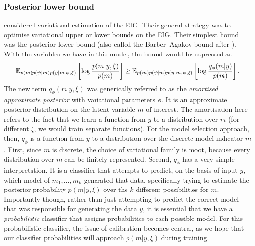 \documentclass[a4paper, 10pt]{report}
\theoremstyle{plain}
\begin{document}
	\subsubsection{Posterior lower bound}
	\citet{foster2019variational} considered variational estimation of the EIG. Their general strategy was to optimise variational upper or lower bounds on the EIG.
	Their simplest bound was the posterior lower bound  (also called the Barber--Agakov bound after \citet{ba}).
	With the variables we have in this model, the bound would be expressed as
	\begin{equation}
	\mathbb{E}_{p(m)p(\psi|m)p(y|m,\psi,\xi)}\left[ \log \frac{p(m|y,\xi)}{p(m)} \right] \ge \mathbb{E}_{p(m)p(\psi|m)p(y|m,\psi,\xi)}\left[ \log \frac{q_\phi(m|y)}{p(m)} \right].
	\end{equation}
	The new term $q_\phi(m|y,\xi)$ was generically referred to as the \emph{amortised approximate posterior} with variational parameters $\phi$. It is an approximate posterior distribution on the latent variable $m$ of interest. The amortisation here refers to the fact that we learn a function from $y$ to a distribution over $m$ (for different $\xi$, we would train separate functions).
	For the model selection approach, then, $q_\phi$ is a function from $y$ to a distribution over the discrete model indicator $m$.
	First, since $m$ is discrete, the choice of variational family is moot, because every distribution over $m$ can be finitely represented.
	Second, $q_\phi$ has a very simple interpretation. It is a classifier that attempts to predict, on the basis of input $y$, which model of $m_1,\dots,m_k$ generated that data, specifically trying to estimate the posterior probability $p(m|y,\xi)$ over the $k$ different possibilities for $m$.
	Importantly though, rather than just attempting to predict the correct model that was responsible for generating the data $y$, it is essential that we have a \emph{probabilistic} classifier that assigns probabilities to each possible model. 
	For this probabilistic classifier, the issue of calibration becomes central, as we hope that our classifier probabilities will approach $p(m|y,\xi)$ during training.
	
\end{document}
